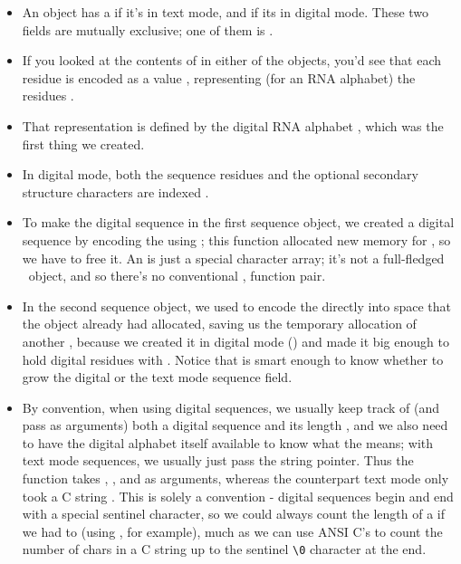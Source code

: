 \begin{itemize}
\item An  object has a  if it's in text
mode, and  if its in digital mode. These two fields are
mutually exclusive; one of them is .

\item If you looked at the contents of  in either of
  the objects, you'd see that each residue is encoded as a value
  , representing (for an RNA alphabet) the residues
  . 

\item That representation is defined by the digital RNA alphabet
  , which was the first thing we created. 

\item In digital mode, both the sequence residues and the optional
  secondary structure characters are indexed .

\item To make the digital sequence in the first sequence object, we
      created a digital sequence  by encoding the
       using ; this
      function allocated new memory for , so we have to
      free it. An  is just a special character array;
      it's not a full-fledged \Easel\ object, and so there's no
      conventional , function pair.

\item In the second sequence object, we used
   to encode the  directly
  into space that the  object already had allocated, saving
  us the temporary allocation of another , because we
  created it in digital mode () and
  made it big enough to hold  digital residues with
  . Notice that  is
  smart enough to know whether to grow the digital or the text mode
  sequence field.

\item By convention, when using digital sequences, we usually keep
  track of (and pass as arguments) both a digital sequence 
  and its length , and we also need to have the digital
  alphabet itself  available to know what the 
  means; with text mode sequences, we usually just pass the string
  pointer. Thus the  function
  takes , , and  as arguments, whereas
  the counterpart text mode  only
  took a C string . This is solely a convention - digital
  sequences begin and end with a special sentinel character, so we
  could always count the length of a  if we had to (using
  , for example), much as we can use ANSI
  C's  to count the number of chars in a C string up
  to the sentinel \verb+\0+  character at the end.


\end{itemize}

